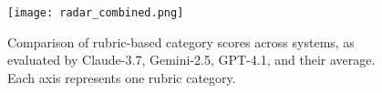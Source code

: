 
\begin{figure}[h]
    \centering
    \texttt{[image: radar\_combined.png]}
    \caption{Comparison of rubric-based category scores across systems, as evaluated by Claude-3.7, Gemini-2.5, GPT-4.1, and their average. Each axis represents one rubric category.}
    \label{fig:radar_combined}
\end{figure}
